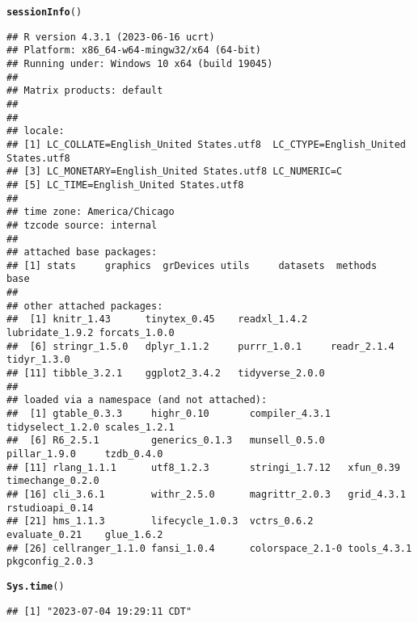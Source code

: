 \documentclass{article}\usepackage[]{graphicx}\usepackage[]{xcolor}
\makeatletter
\newcommand{\hlstd}[1]{\textcolor[rgb]{0.345,0.345,0.345}{#1}}%
\newcommand{\hlkwd}[1]{\textcolor[rgb]{0.737,0.353,0.396}{\textbf{#1}}}%
\newenvironment{kframe}{%
 \def\at@end@of@kframe{}%
 \ifinner\ifhmode%
  \def\at@end@of@kframe{\end{minipage}}%
  \begin{minipage}{\columnwidth}%
 \fi\fi%
 \def\FrameCommand##1{\hskip\@totalleftmargin \hskip-\fboxsep
 \colorbox{shadecolor}{##1}\hskip-\fboxsep
     \hskip-\linewidth \hskip-\@totalleftmargin \hskip\columnwidth}%
 \MakeFramed {\advance\hsize-\width
   \@totalleftmargin\z@ \linewidth\hsize
   \@setminipage}}%
 {\par\unskip\endMakeFramed%
 \at@end@of@kframe}
\newenvironment{knitrout}{}{} %
\makeatother
\begin{document}
\begin{knitrout}
\color{fgcolor}\begin{kframe}
\begin{alltt}
\hlkwd{sessionInfo}\hlstd{()}
\end{alltt}
\begin{verbatim}
## R version 4.3.1 (2023-06-16 ucrt)
## Platform: x86_64-w64-mingw32/x64 (64-bit)
## Running under: Windows 10 x64 (build 19045)
## 
## Matrix products: default
## 
## 
## locale:
## [1] LC_COLLATE=English_United States.utf8  LC_CTYPE=English_United States.utf8   
## [3] LC_MONETARY=English_United States.utf8 LC_NUMERIC=C                          
## [5] LC_TIME=English_United States.utf8    
## 
## time zone: America/Chicago
## tzcode source: internal
## 
## attached base packages:
## [1] stats     graphics  grDevices utils     datasets  methods   base     
## 
## other attached packages:
##  [1] knitr_1.43      tinytex_0.45    readxl_1.4.2    lubridate_1.9.2 forcats_1.0.0  
##  [6] stringr_1.5.0   dplyr_1.1.2     purrr_1.0.1     readr_2.1.4     tidyr_1.3.0    
## [11] tibble_3.2.1    ggplot2_3.4.2   tidyverse_2.0.0
## 
## loaded via a namespace (and not attached):
##  [1] gtable_0.3.3     highr_0.10       compiler_4.3.1   tidyselect_1.2.0 scales_1.2.1    
##  [6] R6_2.5.1         generics_0.1.3   munsell_0.5.0    pillar_1.9.0     tzdb_0.4.0      
## [11] rlang_1.1.1      utf8_1.2.3       stringi_1.7.12   xfun_0.39        timechange_0.2.0
## [16] cli_3.6.1        withr_2.5.0      magrittr_2.0.3   grid_4.3.1       rstudioapi_0.14 
## [21] hms_1.1.3        lifecycle_1.0.3  vctrs_0.6.2      evaluate_0.21    glue_1.6.2      
## [26] cellranger_1.1.0 fansi_1.0.4      colorspace_2.1-0 tools_4.3.1      pkgconfig_2.0.3
\end{verbatim}
\begin{alltt}
\hlkwd{Sys.time}\hlstd{()}
\end{alltt}
\begin{verbatim}
## [1] "2023-07-04 19:29:11 CDT"
\end{verbatim}
\end{kframe}
\end{knitrout}
\end{document}

